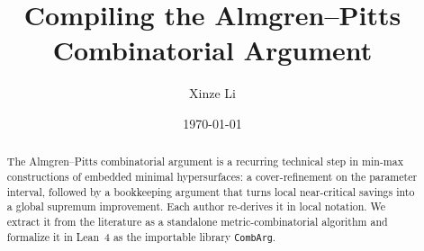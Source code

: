 \documentclass[11pt,reqno]{amsart}
\title{Compiling the Almgren--Pitts Combinatorial Argument}
\author{Xinze Li}
\date{\today}
\theoremstyle{definition}
\newcommand{\CombArg}{\texttt{CombArg}}
\begin{document}
\begin{abstract}
The Almgren--Pitts combinatorial argument is a recurring
technical step in min-max constructions of embedded minimal
hypersurfaces: a cover-refinement on the parameter interval,
followed by a bookkeeping argument that turns local near-critical
savings into a global supremum improvement. Each author
re-derives it in local notation. We extract it from the
literature as a standalone metric-combinatorial algorithm and
formalize it in Lean~4 as the importable library \CombArg.
\end{abstract}

\maketitle








\appendix




\end{document}
